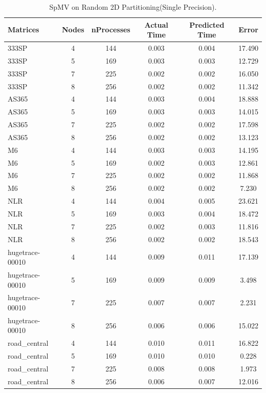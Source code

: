 \documentclass[conference, 10ppt]{IEEEtran}
\begin{document}
\begin{table}[htb]
\caption{SpMV on Random 2D Partitioning(Single Precision).}
\label{tab:spmv-2d-single}
\centering
\begin{tabular}[c]{| l | c | c | c | c | c |}
\hline
Matrices & Nodes & nProcesses & Actual Time & Predicted Time & Error \\ \hline

333SP  &  4  &  144  &  0.003  &  0.004  &  17.490  \\ \hline
333SP  &  5  &  169  &  0.003  &  0.003  &  12.729  \\ \hline
333SP  &  7  &  225  &  0.002  &  0.002  &  16.050  \\ \hline
333SP  &  8  &  256  &  0.002  &  0.002  &  11.342  \\ \hline
AS365  &  4  &  144  &  0.003  &  0.004  &  18.888  \\ \hline
AS365  &  5  &  169  &  0.003  &  0.003  &  14.015  \\ \hline
AS365  &  7  &  225  &  0.002  &  0.002  &  17.598  \\ \hline
AS365  &  8  &  256  &  0.002  &  0.002  &  13.123  \\ \hline
M6  &  4  &  144  &  0.003  &  0.003  &  14.195  \\ \hline
M6  &  5  &  169  &  0.002  &  0.003  &  12.861  \\ \hline
M6  &  7  &  225  &  0.002  &  0.002  &  11.868  \\ \hline
M6  &  8  &  256  &  0.002  &  0.002  &  7.230  \\ \hline
NLR  &  4  &  144  &  0.004  &  0.005  &  23.621  \\ \hline
NLR  &  5  &  169  &  0.003  &  0.004  &  18.472  \\ \hline
NLR  &  7  &  225  &  0.002  &  0.003  &  11.816  \\ \hline
NLR  &  8  &  256  &  0.002  &  0.002  &  18.543  \\ \hline
hugetrace-00010  &  4  &  144  &  0.009  &  0.011  &  17.139  \\ \hline
hugetrace-00010  &  5  &  169  &  0.009  &  0.009  &  3.498  \\ \hline
hugetrace-00010  &  7  &  225  &  0.007  &  0.007  &  2.231  \\ \hline
hugetrace-00010  &  8  &  256  &  0.006  &  0.006  &  15.022  \\ \hline
road\_central  &  4  &  144  &  0.010  &  0.011  &  16.822  \\ \hline
road\_central  &  5  &  169  &  0.010  &  0.010  &  0.228  \\ \hline
road\_central  &  7  &  225  &  0.008  &  0.008  &  1.973  \\ \hline
road\_central  &  8  &  256  &  0.006  &  0.007  &  12.016  \\ \hline




\end{tabular}
\end{table}
\end{document}
